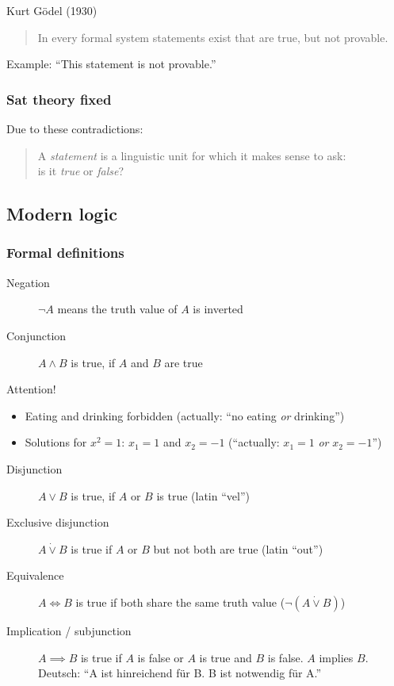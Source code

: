 \documentclass[a4paper,landscape,twocolumn]{article}
\begin{document}
Kurt Gödel (1930)
\begin{quote}
  In every formal system statements exist that
  are true, but not provable.
\end{quote}

Example: \enquote{This statement is not provable.}

\subsubsection{Sat theory fixed}

Due to these contradictions:
\begin{quote}
  A \emph{statement} is a linguistic unit for which it makes sense to ask: \\
  is it \emph{true} or \emph{false}?
\end{quote}

\subsection{Modern logic}
\subsubsection{Formal definitions}

\begin{description}
  \item[Negation]
    $\neg A$ means the truth value of $A$ is inverted
  \item[Conjunction]
    $A \land B$ is true, if $A$ and $B$ are true
\end{description}

Attention!
\begin{itemize}
  \item Eating and drinking forbidden (actually: \enquote{no eating \emph{or} drinking})
  \item Solutions for $x^2 = 1$: $x_1 = 1$ and $x_2 = -1$ (\enquote{actually: $x_1 = 1$ \emph{or} $x_2 = -1$})
\end{itemize}

\begin{description}
  \item[Disjunction]
    $A \lor B$ is true, if $A$ or $B$ is true (latin \enquote{vel})
  \item[Exclusive disjunction]
    $A \dot\lor B$ is true if $A$ or $B$ but not both are true (latin \enquote{out})
  \item[Equivalence]
    $A \iff B$ is true if both share the same truth value ($\neg (A \dot\lor B)$)
  \item[Implication / subjunction]
    $A \implies B$ is true if $A$ is false or $A$ is true and $B$ is false.
    $A$ implies $B$. Deutsch: \enquote{A ist hinreichend für B. B ist notwendig für A.}
\end{description}
\end{document}
